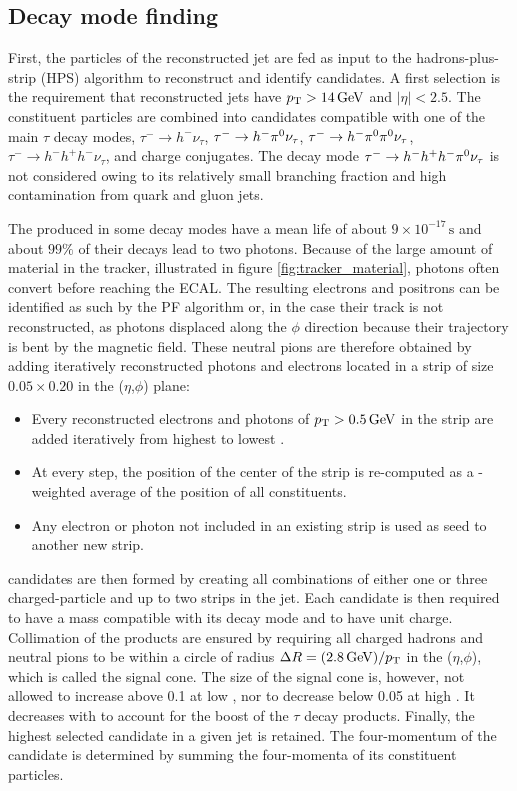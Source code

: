 \subsection{Decay mode finding}

First, the particles of the reconstructed jet are fed as input to the hadrons-plus-strip (HPS) algorithm \cite{tauh_reconstruction} to reconstruct and identify \tauh candidates. A first selection is the requirement that reconstructed jets have $p_{\mathrm{T}} > 14\,\mathrm{GeV}$ and $|\eta| < 2.5$.
The constituent particles are combined into \tauh candidates compatible with one of the main $\tau$ decay modes, $\tau^- \rightarrow h^- \nu_\tau$, $\tau^- \rightarrow h^- \pi^{0} \nu_\tau$, $\tau^- \rightarrow h^- \pi^{0} \pi^{0} \nu_\tau$, $\tau^- \rightarrow h^- h^+ h^- \nu_\tau$, and charge conjugates. The decay mode $\tau^- \rightarrow h^- h^+ h^- \pi^{0} \nu_\tau$ is not considered owing to its relatively small branching fraction and high contamination from quark and gluon jets.

The \pizero produced in some decay modes have a mean life of about $9 \times 10^{-17}\,\mathrm{s}$ and about $99\%$ of their decays lead to two photons. Because of the large amount of material in the tracker, illustrated in figure \ref{fig:tracker_material}, photons often convert before reaching the ECAL. The resulting electrons and positrons can be identified as such by the PF algorithm or, in the case their track is not reconstructed, as photons displaced along the $\phi$ direction because their trajectory is bent by the magnetic field.
These neutral pions are therefore obtained by adding iteratively reconstructed photons and electrons located in a strip of size $0.05 \times 0.20$ in the ($\eta$,$\phi$) plane:
\begin{itemize}
    \item Every reconstructed electrons and photons of $p_{\mathrm{T}} > 0.5\,\mathrm{GeV}$ in the strip are added iteratively from highest to lowest \pt.
    \item At every step, the position of the center of the strip is re-computed as a \pt-weighted average of the position of all constituents.
    \item Any electron or photon not included in an existing strip is used as seed to another new strip.
\end{itemize}

\tauh candidates are then formed by creating all combinations of either one or three charged-particle and up to two strips in the jet.
Each \tauh candidate is then required to have a mass compatible with its decay mode and to have unit charge.
Collimation of the products are ensured by requiring all charged hadrons and neutral pions to be within a circle of radius $\Delta R = (2.8\,\mathrm{GeV})/p_{\mathrm{T}}$ in the ($\eta$,$\phi$), which is called the signal cone.
The size of the signal cone is, however, not allowed to increase above 0.1 at low \pt, nor to decrease below 0.05 at high \pt. It decreases with \pt to account for the boost of the $\tau$ decay products. Finally, the highest \pt selected \tauh candidate in a given jet is retained. The four-momentum of the \tauh candidate is determined by summing the four-momenta of its constituent particles.


